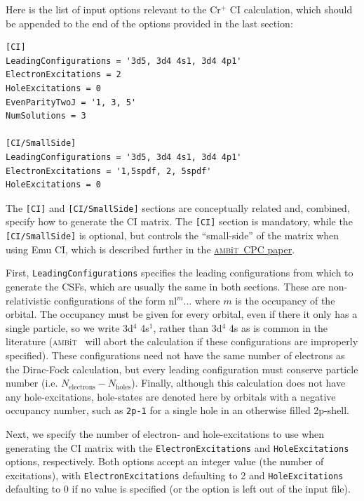 \documentclass{report}
\newcommand{\ambit}{\textsc{amb}{\footnotesize i}\textsc{t}}
\begin{document}
Here is the list of input options relevant to the Cr$^+$ CI calculation, which should be appended to the
end of the options provided in the last section:

\begin{verbatim}
[CI]                                                                           
LeadingConfigurations = '3d5, 3d4 4s1, 3d4 4p1'                                
ElectronExcitations = 2                                                        
HoleExcitations = 0                                                            
EvenParityTwoJ = '1, 3, 5'                                                     
NumSolutions = 3
                                                                               
[CI/SmallSide]                                                                 
LeadingConfigurations = '3d5, 3d4 4s1, 3d4 4p1'                                
ElectronExcitations = '1,5spdf, 2, 5spdf'                                      
HoleExcitations = 0 
\end{verbatim}

The \texttt{[CI]} and \texttt{[CI/SmallSide]} sections are conceptually related and, combined, specify 
how to generate the CI matrix. The \texttt{[CI]} section is mandatory, while the \texttt{[CI/SmallSide]}
is optional, but controls the ``small-side'' of the matrix when using Emu CI, which is described further
in the \href{link_goes_here}{\ambit\  CPC paper}.

First, \texttt{LeadingConfigurations} specifies the leading configurations from which to generate the 
CSFs, which are usually the
same in both sections. These are non-relativistic configurations of the form nl$^{m}...$ where $m$ is 
the occupancy of the orbital. The occupancy must be given for every orbital, even if there it only has a
single particle, so we write 3d$^4$ 4s$^1$, rather than 3d$^4$ 4s as is common in the literature (\ambit
~will abort the calculation if these configurations are improperly specified). These configurations need
not have the same number of electrons as the Dirac-Fock calculation, but every leading configuration
must conserve particle number (i.e. $N_{\mathrm{electrons}} - N_{\mathrm{holes}}$). Finally, although
this calculation does not have any hole-excitations, hole-states are denoted here by orbitals with a
negative occupancy number, such as \texttt{2p-1} for a single hole in an otherwise filled 2p-shell.

Next, we specify the number of electron- and hole-excitations to use when generating the CI matrix with
the \texttt{ElectronExcitations} and \texttt{HoleExcitations} options, respectively. Both options accept
an integer value (the number of excitations), with \texttt{ElectronExcitations} defaulting to 2 and
\texttt{HoleExcitations} defaulting to 0 if no value is specified (or the option is left out of the
input file).
\end{document}
